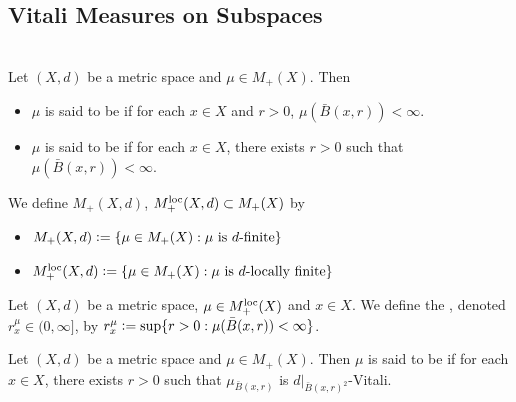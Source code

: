 \documentclass{book}
\begin{document}
	
	
	
	
	
	
	
	
	
	
	
	
	
	
	
	
	
	
	
	
	
	
	
	
	
	
	\subsection{Vitali Measures on Subspaces}
	
	\begin{defn}   \\
		Let $(X, d)$ be a metric space and $\mu \in M_+(X)$. Then
		\begin{itemize}
			\item $\mu$ is said to be  if for each $x \in X$ and $r > 0$, $\mu(\bar{B}(x, r)) < \infty$. 
			\item  $\mu$ is said to be  if for each $x \in X$, there exists $r > 0$ such that $\mu(\bar{B}(x, r)) < \infty$. 
		\end{itemize}
		We define $M_+(X, d)$, $M_+^{\text{loc}}(X, d) \subset M_+(X)$ by
		\begin{itemize} 
			\item $M_+(X, d) \vcentcolon= \{\mu \in M_+(X): \mu \text{ is $d$-finite}\}$
			\item $M_+^{\text{loc}}(X, d) \vcentcolon= \{\mu \in M_+(X): \mu \text{ is $d$-locally finite}\}$
		\end{itemize}
	\end{defn}
	
	\begin{defn} 
		Let $(X, d)$ be a metric space, $\mu \in M_+^{\text{loc}}(X)$ and $x \in X$. We define the , denoted $r_x^{\mu} \in (0, \infty]$, by $r_x^{\mu} \vcentcolon= \sup \{r > 0: \mu(\bar{B}(x, r)) < \infty \}$.
	\end{defn}
	
	\begin{defn} 
		Let $(X, d)$ be a metric space and $\mu \in M_+(X)$. Then $\mu$ is said to be  if for each $x \in X$, there exists $r >0$ such that $\mu_{\bar{B}(x, r)}$ is $d|_{\bar{B}(x, r)^2}$-Vitali. 
	\end{defn}
	
\end{document}

